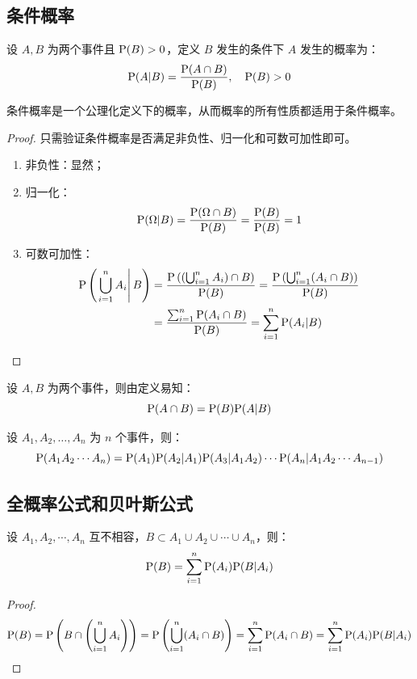 \subsection{条件概率}

\begin{definition}[条件概率]
设 $A,B$ 为两个事件且 $\mathrm{P}(B)>0$，定义 $B$ 发生的条件下 $A$ 发生的概率为：\[\mathrm{P} (A\vert B)=\frac{\mathrm{P}(A\cap B)}{\mathrm{P}(B)},\quad \mathrm{P}(B)>0\]
\end{definition}

\begin{theorem}
条件概率是一个公理化定义下的概率，从而概率的所有性质都适用于条件概率。
\end{theorem}
\begin{proof}
只需验证条件概率是否满足非负性、归一化和可数可加性即可。
\begin{enumerate}
    \item 非负性：显然；
    \item 归一化：\[\mathrm{P}(\Omega\vert B)=\frac{\mathrm{P}(\Omega\cap B)}{\mathrm{P}(B)}=\frac{\mathrm{P}(B)}{\mathrm{P}(B)}=1\]
    \item 可数可加性：
    \begin{align*}
    \mathrm{P}\left(\left.\bigcup_{i=1}^nA_i\right\vert B\right)&=\frac{\mathrm{P}\left(\left(\bigcup_{i=1}^nA_i\right)\cap B\right)}{\mathrm{P}(B)}=\frac{\mathrm{P}\left(\bigcup_{i=1}^n(A_i\cap B)\right)}{\mathrm{P}(B)}\\
    &=\frac{\sum_{i=1}^n\mathrm{P}(A_i\cap B)}{\mathrm{P}(B)}=\sum_{i=1}^n\mathrm{P}(A_i\vert B)
    \end{align*}
\end{enumerate}
\end{proof}

\begin{theorem}[乘法公式]
设 $A,B$ 为两个事件，则由定义易知：\[\mathrm{P} (A\cap B)=\mathrm{P}(B)\mathrm{P}(A\vert B)\]
\end{theorem}

\begin{corollary}
设 $A_1,A_2,\ldots,A_n$ 为 $n$ 个事件，则：\[\mathrm{P}(A_1A_2\cdots A_n)=\mathrm{P}(A_1)\mathrm{P}(A_2\vert A_1)\mathrm{P}(A_3\vert A_1A_2)\cdots\mathrm{P}(A_n\vert A_1A_2\cdots A_{n-1})\]
\end{corollary}


\subsection{全概率公式和贝叶斯公式}

\begin{theorem}[全概率公式]
设 $A_1,A_2,\cdots,A_n$ 互不相容，$B\subset A_1\cup A_2\cup\cdots\cup A_n$，则：\[\mathrm{P}(B)=\sum_{i=1}^n\mathrm{P}(A_i)\mathrm{P}(B\vert A_i)\]
\end{theorem}
\begin{proof}
\[\mathrm{P}(B)=\mathrm{P}\left(B\cap \left(\bigcup_{i=1}^nA_i\right)\right)=\mathrm{P}\left(\bigcup_{i=1}^n(A_i\cap B)\right)=\sum_{i=1}^n\mathrm{P}(A_i\cap B)=\sum_{i=1}^n\mathrm{P}(A_i)\mathrm{P}(B\vert A_i)\]
\end{proof}

